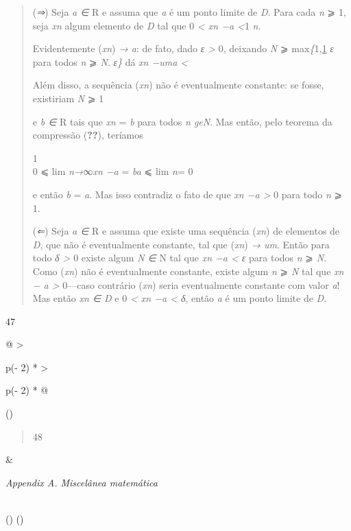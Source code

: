 \documentclass[
]{article}
\begin{document}
\begin{quote}
(\emph{⇒}) Seja \emph{a ∈} R e assuma que \emph{a} é um ponto limite de
\emph{D}. Para cada \emph{n} ⩾ 1, seja \emph{xn} algum elemento de
\emph{D} tal que 0 \emph{\textless{} \textbar xn −a\textbar{}
\textless{}}1 \emph{n}.

Evidentemente (\emph{xn}) \emph{→ a}: de fato, dado \emph{ε
\textgreater{}} 0, deixando \emph{N} ⩾ max\emph{\{}1\emph{,}\uline{1}
\emph{ε} para todos \emph{n} ⩾ \emph{N}. \emph{ε\}} dá \emph{\textbar xn
−uma\textbar{} \textless{}}

Além disso, a sequência (\emph{xn}) não é eventualmente constante: se
fosse, existiriam \emph{N} ⩾ 1

e \emph{b ∈} R tais que \emph{xn} = \emph{b} para todos \emph{n geN}.
Mas então, pelo teorema da compressão (\textbf{??}), teríamos

1\\
0 ⩽ lim \emph{n→}∞\emph{\textbar xn −a\textbar{}} =
\emph{\textbar ba\textbar{}} ⩽ lim \emph{n}= 0

e então \emph{b} = \emph{a}. Mas isso contradiz o fato de que
\emph{\textbar xn −a\textbar{} \textgreater{}} 0 para todo \emph{n} ⩾ 1.

(\emph{⇐}) Seja \emph{a ∈} R e assuma que existe uma sequência
(\emph{xn}) de elementos de \emph{D}, que não é eventualmente constante,
tal que (\emph{xn}) \emph{→ um}. Então para todo \emph{δ \textgreater{}}
0 existe algum \emph{N ∈} N tal que \emph{\textbar xn −a\textbar{}
\textless{} ε} para todos \emph{n} ⩾ \emph{N}. Como (\emph{xn}) não é
eventualmente constante, existe algum \emph{n} ⩾ \emph{N} tal que
\emph{\textbar xn − a\textbar{} \textgreater{}} 0---caso contrário
(\emph{xn}) seria eventualmente constante com valor \emph{a}! Mas então
\emph{xn ∈ D} e 0 \emph{\textless{} \textbar xn −a\textbar{} \textless{}
δ}, então \emph{a} é um ponto limite de \emph{D}.
\end{quote}

47

\begin{longtable}[]{@{}
  >{\raggedright\arraybackslash}p{(\columnwidth - 2\tabcolsep) * }
  >{\raggedright\arraybackslash}p{(\columnwidth - 2\tabcolsep) * }@{}}
\toprule()
\begin{minipage}[b]{\linewidth}\raggedright
\begin{quote}
48
\end{quote}
\end{minipage} & \begin{minipage}[b]{\linewidth}\raggedright
\emph{Appendix A. Miscelânea matemática}
\end{minipage} \\
\midrule()
\endhead
\bottomrule()
\end{longtable}
\end{document}

